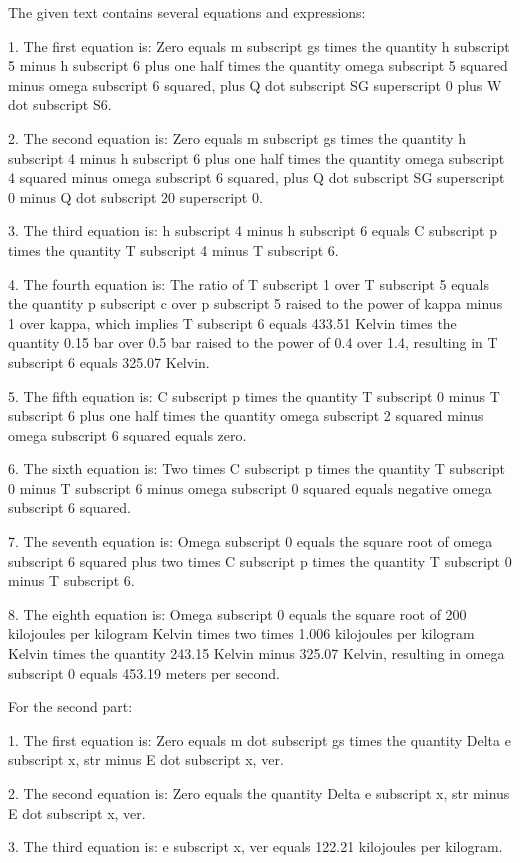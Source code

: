 The given text contains several equations and expressions:

1. The first equation is:
   Zero equals m subscript gs times the quantity h subscript 5 minus h subscript 6 plus one half times the quantity omega subscript 5 squared minus omega subscript 6 squared, plus Q dot subscript SG superscript 0 plus W dot subscript S6.

2. The second equation is:
   Zero equals m subscript gs times the quantity h subscript 4 minus h subscript 6 plus one half times the quantity omega subscript 4 squared minus omega subscript 6 squared, plus Q dot subscript SG superscript 0 minus Q dot subscript 20 superscript 0.

3. The third equation is:
   h subscript 4 minus h subscript 6 equals C subscript p times the quantity T subscript 4 minus T subscript 6.

4. The fourth equation is:
   The ratio of T subscript 1 over T subscript 5 equals the quantity p subscript c over p subscript 5 raised to the power of kappa minus 1 over kappa, which implies T subscript 6 equals 433.51 Kelvin times the quantity 0.15 bar over 0.5 bar raised to the power of 0.4 over 1.4, resulting in T subscript 6 equals 325.07 Kelvin.

5. The fifth equation is:
   C subscript p times the quantity T subscript 0 minus T subscript 6 plus one half times the quantity omega subscript 2 squared minus omega subscript 6 squared equals zero.

6. The sixth equation is:
   Two times C subscript p times the quantity T subscript 0 minus T subscript 6 minus omega subscript 0 squared equals negative omega subscript 6 squared.

7. The seventh equation is:
   Omega subscript 0 equals the square root of omega subscript 6 squared plus two times C subscript p times the quantity T subscript 0 minus T subscript 6.

8. The eighth equation is:
   Omega subscript 0 equals the square root of 200 kilojoules per kilogram Kelvin times two times 1.006 kilojoules per kilogram Kelvin times the quantity 243.15 Kelvin minus 325.07 Kelvin, resulting in omega subscript 0 equals 453.19 meters per second.

For the second part:

1. The first equation is:
   Zero equals m dot subscript gs times the quantity Delta e subscript x, str minus E dot subscript x, ver.

2. The second equation is:
   Zero equals the quantity Delta e subscript x, str minus E dot subscript x, ver.

3. The third equation is:
   e subscript x, ver equals 122.21 kilojoules per kilogram.